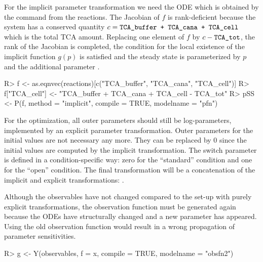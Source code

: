 \documentclass[article]{jss}
\begin{document}
For the implicit parameter transformation we need the ODE which is obtained by the command  from the reactions. The Jacobian of $f$ is rank-deficient because the system has a conserved quantity $c = \verb!TCA_buffer + TCA_cana + TCA_cell!$ which is the total TCA amount. Replacing one element of $f$ by $c - \verb!TCA_tot!$, the rank of the Jacobian is completed, the condition for the local existence of the implicit function $g(p)$ is satisfied and the steady state is parameterized by $p$ and the additional parameter .
%
\begin{CodeChunk}
\begin{CodeInput}
R> f <- as.eqnvec(reactions)[c("TCA_buffer", "TCA_cana", "TCA_cell")]
R> f["TCA_cell"] <- "TCA_buffer + TCA_cana + TCA_cell - TCA_tot"
R> pSS <- P(f, method = "implicit", compile = TRUE, modelname = "pfn")
\end{CodeInput}
\end{CodeChunk}
%
For the optimization, all outer parameters should still be log-parameters, implemented by an explicit parameter transformation. Outer parameters for the initial values are not necessary any more. They can be replaced by 0 since the initial values are computed by the implicit transformation. The switch parameter  is defined in a condition-specific way: zero for the ``standard'' condition and one for the ``open'' condition. The final transformation will be a concatenation of the implicit and explicit transformations: .
%
\begin{CodeChunk}
\end{CodeChunk}
%
Although the observables have not changed compared to the set-up with purely explicit transformations, the observation function must be generated again because the ODEs have structurally changed and a new parameter  has appeared. Using the old observation function would result in a wrong propagation of parameter sensitivities.
%
\begin{CodeChunk}
\begin{CodeInput}
R> g <- Y(observables, f = x, compile = TRUE, modelname = "obsfn2")
\end{CodeInput}
\end{CodeChunk}
\end{document}
